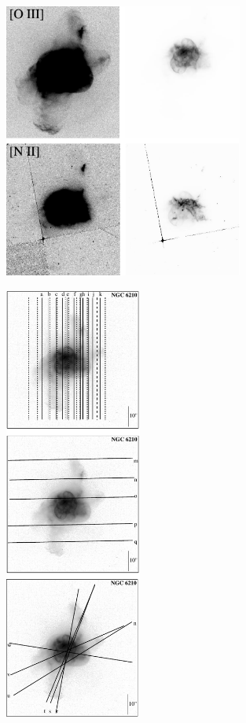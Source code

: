 \documentclass[useAMS, usenatbib]{mnras}
\makeatletter
\newcounter{ionstage}
\renewcommand{\ion}[2]{\setcounter{ionstage}{#2}%
  \ensuremath{\mathrm{#1\,\scriptstyle\Roman{ionstage}}}}
\newcommand\OIIIlam{[\ion{O}{3}]\,5007\,\AA\@}
\makeatother
\begin{document}

\begin{figure}
\centering
  \includegraphics[width=0.7\textwidth]{Figure1.pdf}
  \caption{ }
\end{figure}

\begin{figure}
\centering
  \includegraphics[width=0.4\textwidth]{Figure2a.pdf}
  \caption{ }
\end{figure}
\end{document}
